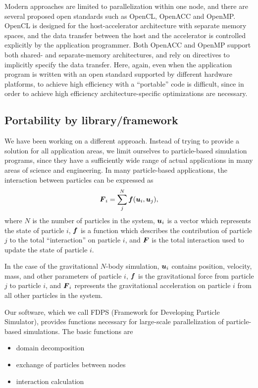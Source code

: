 Modern approaches are limited to parallelization within one node,
and there are several proposed open standards such as OpenCL, OpenACC
and OpenMP. OpenCL is designed for  the host-accelerator architecture
with separate memory spaces, and the data transfer between the
host and the accelerator is controlled explicitly by the application
programmer. Both OpenACC and OpenMP support both shared- and
separate-memory architectures, and rely on directives to implicitly
specify the data transfer. Here, again, even when the application
program is written with an open standard supported by different
hardware platforms,  to achieve high efficiency
with a ``portable'' code is difficult, since in order to achieve high
efficiency architecture-specific optimizations are necessary.

\subsection{Portability by library/framework}


We have been working on a different approach. Instead of trying to
provide a solution for all application areas, we limit ourselves to
particle-based simulation programs, since they have a sufficiently wide
range of actual applications in many areas of science and
engineering. In many particle-based applications, the interaction
between particles can be expressed  as 
\begin{equation}
    \myvec{F}_{i} = \sum_j^N \myvec{f}  (\myvec{u}_{i}, \myvec{u}_{j}),
      \label{eq:basic}
\end{equation}
where  $N$ is the number of particles in the system, $\myvec{u}_i$ is
a vector which represents the state  of  particle $i$, 
$\myvec{f}$ is a function which describes
the contribution of particle $j$ to the total ``interaction'' on
particle $i$, and $\myvec{F}$ is the total
interaction used to update the state of particle $i$.

In the case of the gravitational $N$-body simulation, $\myvec{u}_i$
contains position, velocity, mass, and other parameters of particle
$i$, $\myvec{f}$ is the gravitational force from particle $j$ to
particle $i$, and $\myvec{F}_i$ represents the gravitational
acceleration on particle $i$ from all other particles in the system.

Our software, which we call FDPS (Framework for Developing
Particle Simulator\cite{Iwasawaetal2016}), provides functions necessary for large-scale
parallelization of particle-based simulations. The basic functions are
\begin{itemize}

  \item domain decomposition
  \item exchange of particles between nodes
  \item interaction calculation  
\end{itemize}  

